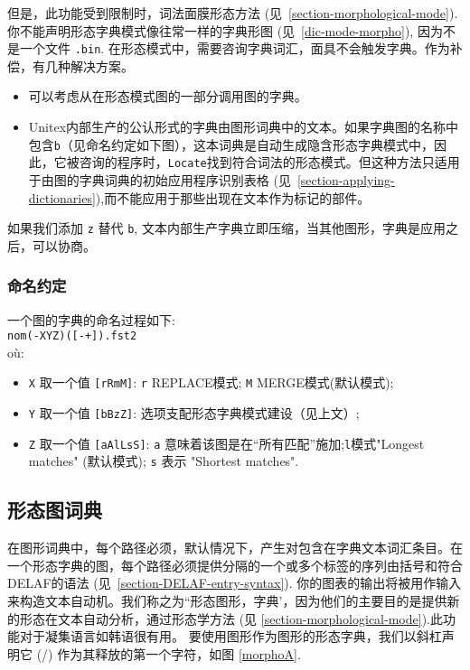 \bigskip
\noindent 但是，此功能受到限制时，词法面膜形态方法
(见~\ref{section-morphological-mode}). 你不能声明形态字典模式像往常一样的字典形图 (见~\ref{dic-mode-morpho}),
因为不是一个文件 \verb+.bin+. 在形态模式中，需要咨询字典词汇，面具不会触发字典。作为补偿，有几种解决方案。
\begin{itemize}
\item 可以考虑从在形态模式图的一部分调用图的字典。
\item Unitex内部生产的公认形式的字典由图形词典中的文本。如果字典图的名称中包含\verb+b+（见命名约定如下图），这本词典是自动生成隐含形态字典模式中，因此，它被咨询的程序时，\verb+Locate+找到符合词法的形态模式。但这种方法只适用于由图的字典词典的初始应用程序识别表格 (见~\ref{section-applying-dictionaries}),而不能应用于那些出现在文本作为标记的部件。
\end{itemize}
如果我们添加 \verb+z+ 替代  \verb+b+, 文本内部生产字典立即压缩，当其他图形，字典是应用之后，可以协商。
 
\subsubsection{命名约定}
一个图的字典的命名过程如下:\\

\verb$nom(-XYZ)([-+]).fst2$\\

\noindent où:
\begin{itemize}
\item \verb+X+ 取一个值 \verb+[rRmM]+: \verb+r+ REPLACE模式; \verb+M+
MERGE模式(默认模式);
\item \verb+Y+ 取一个值 \verb+[bBzZ]+: 选项支配形态字典模式建设（见上文）;
\item \verb+Z+ 取一个值 \verb+[aAlLsS]+: \verb+a+ 意味着该图是在“所有匹配”施加;\verb+l+模式"Longest matches" (默认模式); 
\verb+s+ 表示 "Shortest matches".
\end{itemize}


\subsection{形态图词典}
\label{section-morphological-dictionary-graphs}
在图形词典中，每个路径必须，默认情况下，产生对包含在字典文本词汇条目。在一个形态字典的图，每个路径必须提供分隔的一个或多个标签的序列由括号和符合DELAF的语法
 (见~\ref{section-DELAF-entry-syntax}).
你的图表的输出将被用作输入来构造文本自动机。我们称之为``形态图形，字典'，因为他们的主要目的是提供新的形态在文本自动分析，通过形态学方法
(见 \ref{section-morphological-mode}).此功能对于凝集语言如韩语很有用。
要使用图形作为图形的形态字典，我们以斜杠声明它 (/) 作为其释放的第一个字符，如图 \ref{morphoA}.

